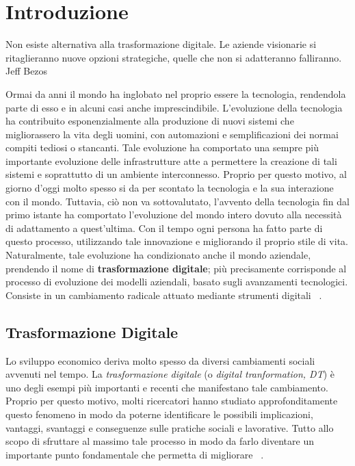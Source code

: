 \chapter{Introduzione}
\label{ch:Introduzione}

\begin{citazione}
Non esiste alternativa alla trasformazione digitale. Le aziende visionarie si ritaglieranno nuove opzioni strategiche, quelle che non si adatteranno falliranno. Jeff Bezos \cite{jeff_bezos_cite}
\end{citazione}

Ormai da anni il mondo ha inglobato nel proprio essere la tecnologia, rendendola parte di esso e in alcuni casi anche imprescindibile. L’evoluzione della tecnologia ha contribuito esponenzialmente alla produzione di nuovi sistemi che migliorassero la vita degli uomini, con automazioni e semplificazioni dei normai compiti tediosi o stancanti. Tale evoluzione ha comportato una sempre più importante evoluzione delle infrastrutture atte a permettere la creazione di tali sistemi e soprattutto di un ambiente interconnesso. Proprio per questo motivo, al giorno d'oggi molto spesso si da per scontato la tecnologia e la sua interazione con il mondo. Tuttavia, ciò non va sottovalutato, l'avvento della tecnologia fin dal primo istante ha comportato l'evoluzione del mondo intero dovuto alla necessità di adattamento a quest'ultima. Con il tempo ogni persona ha fatto parte di questo processo, utilizzando tale innovazione e migliorando il proprio stile di vita. Naturalmente, tale evoluzione ha condizionato anche il mondo aziendale, prendendo il nome di \textbf{trasformazione digitale}; più precisamente corrisponde al processo di evoluzione dei modelli aziendali, basato sugli avanzamenti tecnologici. Consiste in un cambiamento radicale attuato mediante strumenti digitali ~\cite{redhat_digital_transformation}.

\section{Trasformazione Digitale}
Lo sviluppo economico deriva molto spesso da diversi cambiamenti sociali avvenuti nel tempo. La \textit{trasformazione digitale} (o \textit{digital tranformation, DT}) è uno degli esempi più importanti e recenti che manifestano tale cambiamento. Proprio per questo motivo, molti ricercatori hanno studiato approfonditamente questo fenomeno in modo da poterne identificare le possibili implicazioni, vantaggi, svantaggi e conseguenze sulle pratiche sociali e lavorative. Tutto allo scopo di sfruttare al massimo tale processo in modo da farlo diventare un importante punto fondamentale che permetta di migliorare ~\cite{sciencedirect_digital_transformation}.

